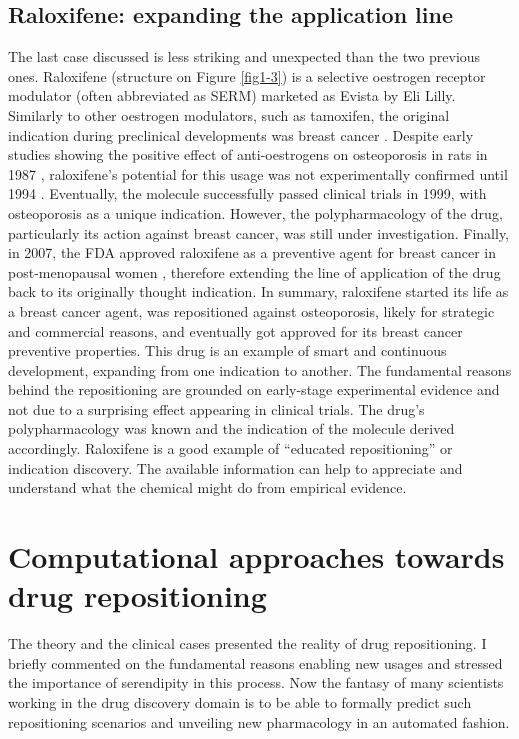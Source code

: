 \subsection{Raloxifene: expanding the application line}

The last case discussed is less striking and unexpected than the two previous ones. Raloxifene (structure on Figure \ref{fig1-3}) is a selective oestrogen receptor modulator (often abbreviated as SERM) marketed as Evista by Eli Lilly. Similarly to other oestrogen modulators, such as tamoxifen, the original indication during preclinical developments was breast cancer \citep{ashburn2004drug}. Despite early studies showing the positive effect of anti-oestrogens on osteoporosis in rats in 1987 \citep{jordan1987effects}, raloxifene's potential for this usage was not experimentally confirmed until 1994 \citep{black1994raloxifene}. Eventually, the molecule successfully passed clinical trials in 1999, with osteoporosis as a unique indication. However, the polypharmacology of the drug, particularly its action against breast cancer, was still under investigation. Finally, in 2007, the FDA approved raloxifene as a preventive agent for breast cancer in post-menopausal women \citep{fdaraloxifen}, therefore extending the line of application of the drug back to its originally thought indication. In summary, raloxifene started its life as a breast cancer agent, was repositioned against osteoporosis, likely for strategic and commercial reasons, and eventually got approved for its breast cancer preventive properties. This drug is an example of smart and continuous development, expanding from one indication to another. The fundamental reasons behind the repositioning are grounded on early-stage experimental evidence and not due to a surprising effect appearing in clinical trials. The drug's polypharmacology was known and the indication of the molecule derived accordingly. Raloxifene is a good example of ``educated repositioning'' or indication discovery. The available information can help to appreciate and understand what the chemical might do from empirical evidence.

\section{Computational approaches towards drug repositioning}
\label{approaches}

The theory and the clinical cases presented the reality of drug repositioning. I briefly commented on the fundamental reasons enabling new usages and stressed the importance of serendipity in this process. Now the fantasy of many scientists working in the drug discovery domain is to be able to formally predict such repositioning scenarios and unveiling new pharmacology in an automated fashion.

